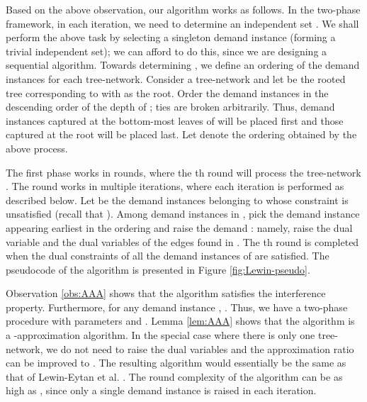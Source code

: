 \documentclass[11pt]{article}
\begin{document}
Based on the above observation, our algorithm works as follows.
In the two-phase framework, in each iteration, we need to determine an independent set .
We shall perform the above task by selecting a singleton demand instance  (forming a trivial independent set);
we can afford to do this, since we are designing a sequential algorithm.
Towards determining , we define an ordering of the demand instances for each tree-network.
Consider a tree-network  and let  be the rooted tree corresponding to  with  as the root. 
Order the demand instances  in the descending order of the depth of ;
ties are broken arbitrarily. Thus, demand instances captured at the bottom-most leaves of  will 
be placed first and those captured at the root will be placed last.
Let  denote the ordering obtained by the above process.

The first phase works in  rounds, where the th round will process the tree-network .
The round  works in multiple iterations, where each iteration is performed as described below.
Let  be the demand instances belonging to  whose constraint is unsatisfied (recall that ).
Among demand instances in , pick the demand instance  appearing earliest in the ordering 
and raise the demand : namely, raise the dual variable  and the dual variables
of the edges found in . The th round is completed when the dual constraints of 
all the demand instances of  are satisfied.
The pseudocode of the algorithm is presented in Figure \ref{fig:Lewin-pseudo}.

Observation \ref{obs:AAA} shows that the algorithm satisfies the interference property.
Furthermore, for any demand instance , .
Thus, we have a two-phase procedure with parameters  and .
Lemma \ref{lem:AAA} shows that the algorithm is a -approximation algorithm.
In the special case where there is only one tree-network, we do not need to raise
the dual variables  and the approximation ratio can be improved to .
The resulting algorithm would essentially be the same as that of Lewin-Eytan et al. \cite{Lewin-Eytan}.
The round complexity of the algorithm can be as high as , since only a single demand instance is 
raised in each iteration. 
\end{document}
